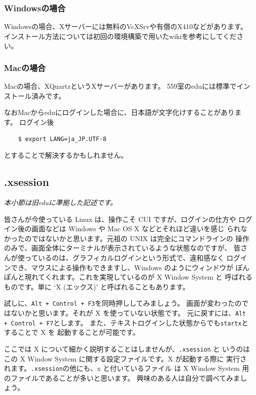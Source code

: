 \documentclass[a4j]{ltjreport}
\begin{document}
    \subsubsection{Windowsの場合}
    Windowsの場合、Xサーバーには無料のVcXSrvや有償のX410などがあります。
    インストール方法については初回の環境構築で用いたwikiを参考にしてください。

    \subsubsection{Macの場合}
    Macの場合、XQuartzというXサーバーがあります。
    559室のeduには標準でインストール済みです。

    なおMacからeduにログインした場合に、日本語が文字化けすることがあります。
    ログイン後
    \begin{verbatim}
    $ export LANG=ja_JP.UTF-8
    \end{verbatim}
    とすることで解決するかもしれません。

    \subsection{.xsession}
    \emph{本小節は旧eduに準拠した記述です。}

    皆さんが今使っている Linux は、操作こそ CUI ですが、ログインの仕方や
    ログイン後の画面などは Windows や Mac OS X などとそれほど違いを感じ
    られなかったのではないかと思います。元祖の UNIX は完全にコマンドラインの
    操作のみで、画面全体にターミナルが表示されているような状態なのですが、
    皆さんが使っているのは、グラフィカルログインという形式で、違和感なく
    ログインでき、マウスによる操作もできますし、Windows のようにウィンドウが
    ぽんぽんと現れてくれます。これを実現しているのが X Window System と
    呼ばれるものです。単に `X (エックス)' と呼ばれることもあります。

    試しに、\verb|Alt + Control + F3|を同時押ししてみましょう。
    画面が変わったのではないかと思います。それが X を使っていない状態です。
    元に戻すには、\verb|Alt + Control + F7|とします。
    また、テキストログインした状態からでも\verb+startx+とすることで X を
    起動することが可能です。

    ここでは X について細かく説明することはしませんが、\verb+.xsession+ と
    いうのはこの X Window System に関する設定ファイルです。X が起動する際に
    実行されます。\verb+.xsession+の他にも、x と付いているファイル
    は X Window System 用のファイルであることが多いと思います。
    興味のある人は自分で調べてみましょう。
\end{document}
